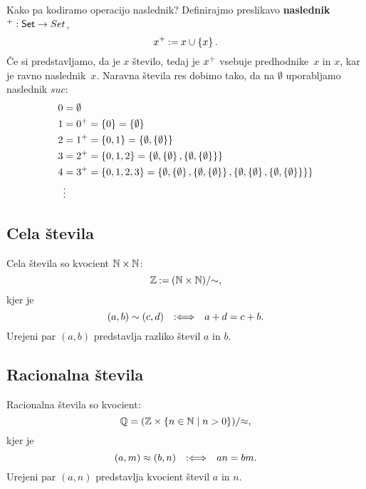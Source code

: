 Kako pa kodiramo operacijo naslednik? Definirajmo preslikavo \textbf{naslednik} ${}^{+} : \mathsf{Set} \to Set$,
%
\begin{equation*}
  {x^{+}} \mathbin{{:}{=}} x \cup \left\{x\right\}.
\end{equation*}
%
Če si predstavljamo, da je $x$ število, tedaj je ${x^{+}}$ vsebuje predhodnike~$x$ in $x$, kar je ravno naslednik~$x$.
Naravna števila res dobimo tako, da na $\emptyset$ uporabljamo naslednik $suc{{}}$:
%
\begin{align*}
    0 &= \emptyset \\
    1 &= {0^{+}} = \left\{ 0 \right\} = \left\{\emptyset\right\} \\
    2 &= {1^{+}} = \left\{0, 1\right\} = \left\{\emptyset, \left\{\emptyset\right\}\right\} \\
    3 &= {2^{+}} = \left\{0, 1, 2\right\} = \left\{\emptyset, \left\{\emptyset\right\}, \left\{\emptyset, \left\{\emptyset\right\}\right\}\right\} \\
    4 &= {3^{+}} = \left\{0, 1, 2, 3\right\} =
       \left\{\emptyset, \left\{\emptyset\right\}, \left\{\emptyset, \left\{\emptyset\right\}\right\},
            \left\{\emptyset, \left\{\emptyset\right\}, \left\{\emptyset, \left\{\emptyset\right\}\right\}\right\}\right\} \\
      &\vdots
\end{align*}

\subsection{Cela števila}

Cela števila so kvocient $\mathbb{N} \times \mathbb{N}$:
%
\begin{equation*}
    \mathbb{Z} \mathbin{{:}{=}} (\mathbb{N} \times \mathbb{N})/{\sim},
\end{equation*}
%
kjer je
%
\begin{equation*}
  (a,b) \sim (c,d) \quad {{:}{\Longleftrightarrow}}\quad a + d = c + b.
\end{equation*}
%
Urejeni par $(a, b)$ predstavlja razliko števil $a$ in $b$.


\subsection{Racionalna števila}

Racionalna števila so kvocient:
%
\begin{equation*}
  \mathbb{Q} = (\mathbb{Z} \times \left\{n \in \mathbb{N} \; \middle| \; n > 0\right\})/{\approx},
\end{equation*}
%
kjer je
%
\begin{equation*}
    (a,m) \approx (b,n) \quad {{:}{\Longleftrightarrow}}\quad a n = b m.
\end{equation*}
%
Urejeni par $(a, n)$ predstavlja kvocient števil $a$ in $n$.

